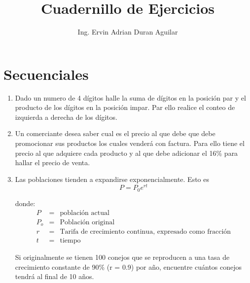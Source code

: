 \documentclass{scrartcl}
\title{Cuadernillo de Ejercicios}
\author{Ing. Ervin Adrian Duran Aguilar}
\date{}
\begin{document}
	\maketitle
	\section{Secuenciales}
	
	\begin{enumerate}
		\item Dado un numero de 4 dígitos halle la suma de dígitos en la posición par y el producto de los dígitos en la posición impar. Par ello realice el conteo de izquierda a derecha de los dígitos.
		\item Un comerciante desea saber cual es el precio al que debe que debe promocionar sus productos los cuales venderá con factura. Para ello tiene el precio al que adquiere cada producto y al que debe adicionar el 16\% para hallar el precio de venta.
        
        \item Las poblaciones tienden a expandirse exponencialmente. Esto es 
        \begin{equation*}
        	P = P_{0}e^{rt}
        \end{equation*}
        
        donde:
		\begin{eqnarray*}
			P		   &=&	\mbox{población actual} \\
			P_{o}  &=& \mbox{Población original} \\
			r 			& = & \mbox{Tarifa de crecimiento continua, expresado como fracción}\\
			t 			& = & \mbox{tiempo}
		\end{eqnarray*}
		
		Si originalmente se tienen 100 conejos que se reproducen a una tasa de crecimiento constante de 90\% (r = 0.9) por año, encuentre cuántos conejos tendrá al final de 10
		años.
	\end{enumerate}
		
\end{document}

